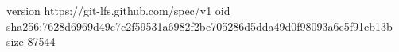 version https://git-lfs.github.com/spec/v1
oid sha256:7628d6969d49c7c2f59531a6982f2be705286d5dda49d0f98093a6c5f91eb13b
size 87544
